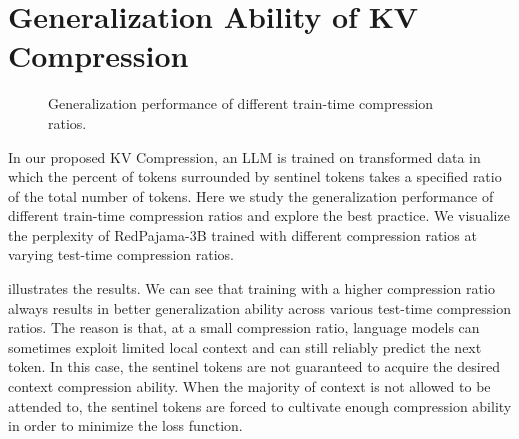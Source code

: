 \section{Generalization Ability of KV Compression}
\begin{figure}[th]
	\centering
	\caption{Generalization performance of different train-time compression ratios. }
	\label{fig:extrapolation}
\end{figure}
\label{appendix:extrapolation}
In our proposed KV Compression, an LLM is trained on transformed data in which the percent of tokens surrounded by sentinel tokens takes a specified ratio of the total number of tokens. Here we study the generalization performance of different train-time compression ratios and explore the best practice. 
We visualize the perplexity of RedPajama-3B trained with different compression ratios at varying test-time compression ratios. 

 illustrates the results. We can see that training with a higher compression ratio always results in better generalization ability across various test-time compression ratios. The 
reason is that, at a small compression ratio, language models can sometimes exploit limited local context and can still reliably predict the next token. In this case, the sentinel tokens are not guaranteed to acquire the desired context compression ability. When the majority of context is not allowed to be attended to, the sentinel tokens are forced to cultivate enough compression ability in order to 
minimize the loss function.

